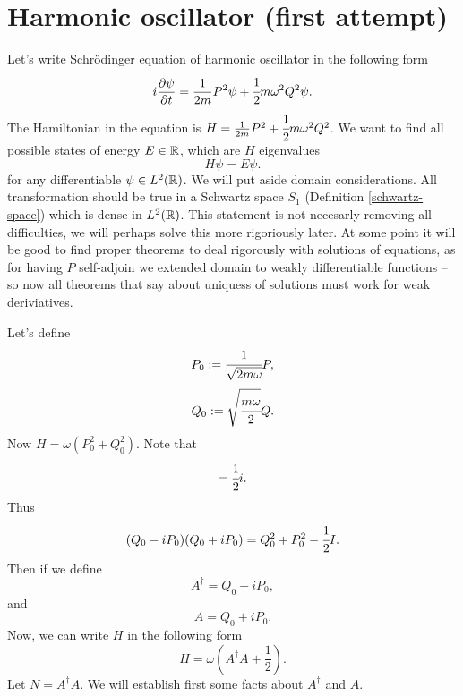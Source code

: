 \documentclass[main.tex]{subfiles}
\begin{document}
\section{Harmonic oscillator (first attempt)}
Let's write Schrödinger equation of harmonic oscillator in the following form
\begin{equation}
    i\frac{\partial \psi}{\partial t} = \frac{1}{2m}P^2\psi + \cfrac{1}{2}m\omega^2 Q^2\psi.
\end{equation}
The Hamiltonian in the equation is $H = \frac{1}{2m}P^2 + \cfrac{1}{2}m\omega^2 Q^2$.
We want to find all possible states of energy $E\in \mathbb{R}$, which are $H$ eigenvalues
\begin{equation}
    H\psi = E\psi.
\end{equation}
for any differentiable $\psi\in L^2(\mathbb{R})$. We will put aside domain considerations. All transformation should be true in a Schwartz space $S_1$ (Definition \ref{schwartz-space}) which is dense in $L^2(\mathbb{R})$. This statement is not necesarly removing all difficulties, we will perhaps solve this more rigoriously later. At some point it will be good to find proper theorems to deal rigorously with solutions of equations, as for having $P$ self-adjoin we extended domain to weakly differentiable functions -- so now all theorems that say about uniquess of solutions must work for weak deriviatives.
  
Let's define
\begin{equation}
P_0 := \cfrac{1}{\sqrt{2m\omega}}P,
\end{equation}
\begin{equation}
Q_0 := \sqrt{\cfrac{m\omega}{2}}Q.
\end{equation}
Now $H = \omega(P_0^2 + Q_0^2)$.
Note that 
\begin{equation}
[Q_0, P_0] = \cfrac{1}{2}i.
\end{equation}
Thus
\begin{equation}
(Q_0 - iP_0)(Q_0 + iP_0) = Q_0^2 + P_0^2 - \cfrac{1}{2}I.
\end{equation}
Then if we define
\begin{equation}
    A^\dag = Q_0 -iP_0,
\end{equation}
and 
\begin{equation}
    A = Q_0 + iP_0.
\end{equation}
Now, we can write $H$ in the following form
\begin{equation}
    H = \omega(A^\dag A + \frac{1}{2}). 
\end{equation}
Let $N = A^\dag A$.
We will establish first some facts about $A^\dag$ and $A$.
\end{document}
